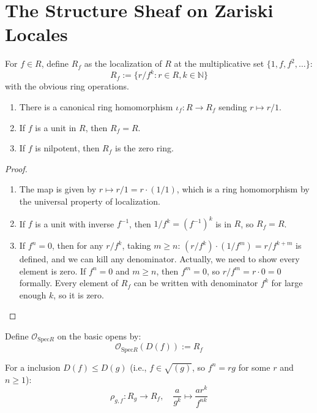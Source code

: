 \section{The Structure Sheaf on Zariski Locales}

\begin{definition}
  \label{def:localization-element}
  \leanok
  For $f \in R$, define $R_f$ as the localization of $R$ at the multiplicative set $\{1, f, f^2, \ldots\}$:
  $$R_f := \{r/f^k : r \in R, k \in \mathbb{N}\}$$
  with the obvious ring operations.
\end{definition}

\begin{lemma}
  \label{lemma:localization-properties}
  \leanok
  \begin{enumerate}
    \item There is a canonical ring homomorphism $\iota_f: R \to R_f$ sending $r \mapsto r/1$.
    \item If $f$ is a unit in $R$, then $R_f = R$.
    \item If $f$ is nilpotent, then $R_f$ is the zero ring.
  \end{enumerate}
\end{lemma}

\begin{proof}
  \leanok
  \begin{enumerate}
    \item The map is given by $r \mapsto r/1 = r \cdot (1/1)$, which is a ring homomorphism by the universal property of localization.
    
    \item If $f$ is a unit with inverse $f^{-1}$, then $1/f^k = (f^{-1})^k$ is in $R$, so $R_f = R$.
    
    \item If $f^n = 0$, then for any $r/f^k$, taking $m \geq n$: $(r/f^k) \cdot (1/f^m) = r/f^{k+m}$ is defined, 
    and we can kill any denominator. Actually, we need to show every element is zero. 
    If $f^n = 0$ and $m \geq n$, then $f^m = 0$, so $r/f^m = r \cdot 0 = 0$ formally. 
    Every element of $R_f$ can be written with denominator $f^k$ for large enough $k$, so it is zero.
  \end{enumerate}
\end{proof}

\begin{definition}
  \label{def:structure-sheaf-zariski}
  \leanok
  Define $\mathcal{O}_{\mathrm{Spec} R}$ on the basic opens by:
  $$\mathcal{O}_{\mathrm{Spec} R}(D(f)) := R_f$$
  
  For a inclusion $D(f) \leq D(g)$ (i.e., $f \in \sqrt{(g)}$, so $f^n = rg$ for some $r$ and $n \geq 1$):
  $$\rho_{g,f}: R_g \to R_f, \quad \frac{a}{g^k} \mapsto \frac{a r^k}{f^{nk}}$$
\end{definition}

